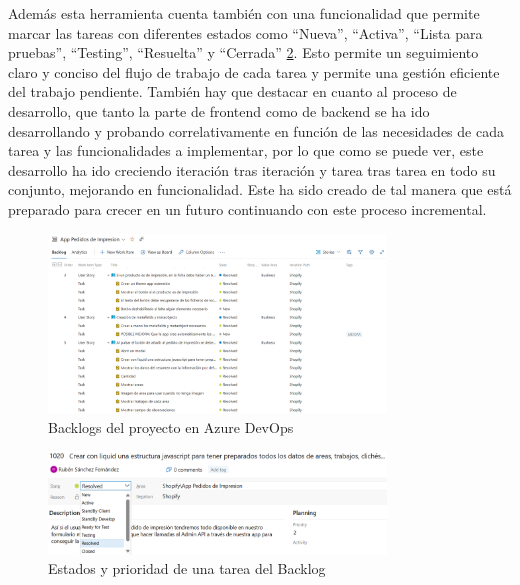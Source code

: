 \documentclass[12pt]{article}
\begin{document}
Además esta herramienta cuenta también con una funcionalidad que permite marcar las tareas con diferentes estados como ``Nueva'', ``Activa'', ``Lista para pruebas'', ``Testing'', ``Resuelta'' y ``Cerrada'' \ref{fig:4}. Esto permite un seguimiento claro y conciso del flujo de trabajo de cada tarea
y permite una gestión eficiente del trabajo pendiente. También hay que destacar en cuanto al proceso de desarrollo, que tanto la parte de frontend como de backend se ha ido desarrollando y probando correlativamente en función de las necesidades de cada tarea y las funcionalidades a implementar, por lo que como se puede ver, 
este desarrollo ha ido creciendo iteración tras iteración y tarea tras tarea en todo su conjunto, mejorando en funcionalidad. Este ha sido creado de tal manera que está preparado para crecer en un futuro continuando con este proceso incremental.

\begin{figure}[ht]
    \centering
    \includegraphics[width=0.8\textwidth]{imagenes/Backlogs de Devops.png}
    \caption{\label{fig:3}Backlogs del proyecto en Azure DevOps}
    \vspace{\fill}
\end{figure}

\begin{figure}[ht]
    \centering
    \includegraphics[width=0.8\textwidth]{imagenes/Estados y prioridad de tarea.png}
    \caption{\label{fig:4}Estados y prioridad de una tarea del Backlog}
    \vspace{\fill}
\end{figure}
\end{document}
